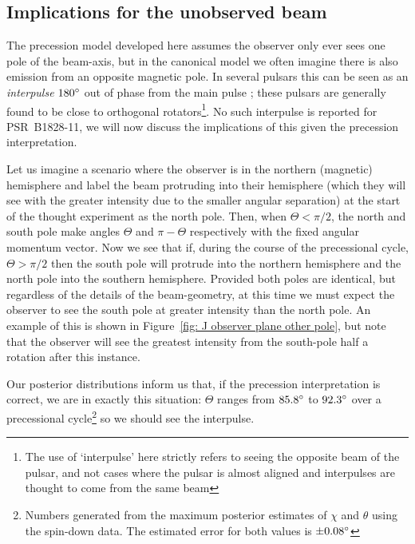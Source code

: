 \documentclass[../full_thesis/full_thesis.tex]{subfiles}
\begin{document}
\begin{subappendices}
\section{Implications for the unobserved beam}
\label{sec: implications for the unobserved beam}
The precession model developed here assumes the observer only ever sees one
pole of the beam-axis, but in the canonical model we often imagine there is
also emission from an opposite magnetic pole. In several pulsars this can be
seen as an \emph{interpulse} $180^{\circ}$ out of phase from the main pulse
\citep{Lyne1988, Maciesiak2011}; these pulsars are generally found to be close
to orthogonal rotators\footnote{The use of `interpulse' here strictly refers to
seeing the opposite beam of the pulsar, and not cases where the pulsar is
almost aligned and interpulses are thought to come from the same beam}. No
such interpulse is reported for PSR~B1828-11, we will now discuss the implications
of this given the precession interpretation.

Let us imagine a scenario where the observer is in the northern (magnetic)
hemisphere and label the beam protruding into their hemisphere (which they will
see with the greater intensity due to the smaller angular separation) at the
start of the thought experiment as the north pole.  Then, when $\Theta < \pi/2$,
the north and south
pole make angles $\Theta$ and $\pi-\Theta$ respectively with the fixed angular
momentum vector. Now we see that if, during the course of the precessional
cycle, $\Theta > \pi/2$ then the south pole will protrude into the northern
hemisphere and the north pole into the southern hemisphere. Provided both poles
are identical, but regardless of the details of the beam-geometry, at this time
we must expect the observer to see the south pole at greater intensity than the
north pole. An example of this is shown in Figure~\ref{fig: J observer plane
other pole}, but note that the observer will see the greatest intensity from
the south-pole half a rotation after this instance.

Our posterior distributions inform us that, if the precession interpretation is
correct, we are in exactly this situation: $\Theta$ ranges from $85.8^{\circ}$
to $92.3^{\circ}$ over a precessional cycle\footnote{Numbers generated from the
maximum posterior estimates of $\chi$ and $\theta$ using the spin-down data.
The estimated error for both values is $\pm0.08^{\circ}$} so we should see the
interpulse.


\end{subappendices}
\end{document}
